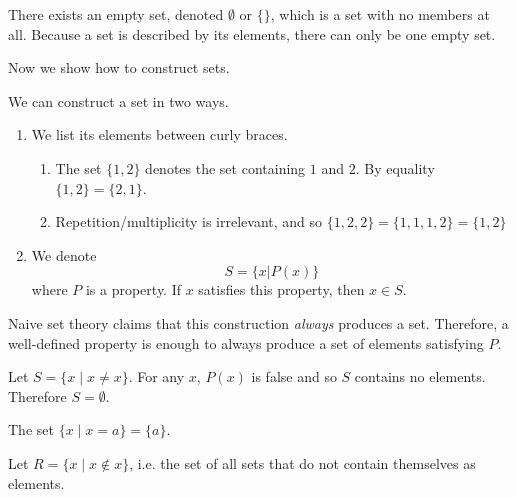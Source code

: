 \documentclass{article}
\begin{document}
    \begin{definition}
      There exists an empty set, denoted $\emptyset$ or $\{\}$, which is a set with no members at all. Because a set is described by its elements, there can only be one empty set. 
    \end{definition}

    Now we show how to construct sets. 

    \begin{definition}
      We can construct a set in two ways. 
      \begin{enumerate}
        \item We list its elements between curly braces. 
        \begin{enumerate}
          \item The set $\{1, 2\}$ denotes the set containing $1$ and $2$. By equality $\{1, 2\} = \{2, 1\}$. 
          \item Repetition/multiplicity is irrelevant, and so $\{1, 2, 2\} = \{1, 1, 1, 2\} = \{1, 2\}$ 
        \end{enumerate} 

        \item We denote 
        \begin{equation}
          S = \{ x | P(x) \}
        \end{equation} 
        where $P$ is a property. If $x$ satisfies this property, then $x \in S$. 
      \end{enumerate}
      Naive set theory claims that this construction \textit{always} produces a set. Therefore, a well-defined property is enough to always produce a set of elements satisfying $P$. 
    \end{definition} 

    \begin{example}
      Let $S = \{x \mid x \neq x \}$. For any $x$, $P(x)$ is false and so $S$ contains no elements. Therefore $S = \emptyset$. 
    \end{example}

    \begin{example}
      The set $\{x \mid x = a \} = \{a\}$. 
    \end{example}

    \begin{example}
      Let $R = \{x \mid x \not\in x\}$, i.e. the set of all sets that do not contain themselves as elements. 
    \end{example}
\end{document}
